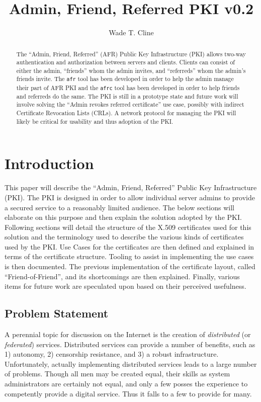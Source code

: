 \documentclass{article}
\title{Admin, Friend, Referred PKI v0.2}
\author{Wade T. Cline}
\begin{document}
\begin{abstract}
The ``Admin, Friend, Referred'' (AFR) Public Key Infrastructure (PKI) allows two-way authentication and authorization between servers and clients.  Clients can consist of either the admin, ``friends'' whom the admin invites, and ``referreds'' whom the admin's friends invite.  The \texttt{afr} tool has been developed in order to help the admin manage their part of AFR PKI and the \texttt{afrc} tool has been developed in order to help friends and referreds do the same.  The PKI is still in a prototype state and future work will involve solving the ``Admin revokes referred certificate'' use case, possibly with indirect Certificate Revocation Lists (CRLs).  A network protocol for managing the PKI will likely be critical for usability and thus adoption of the PKI.
\end{abstract}

\section{Introduction}
This paper will describe the ``Admin, Friend, Referred'' Public Key Infrastructure (PKI).  The PKI is designed in order to allow individual server admins to provide a secured service to a reasonably limited audience.  The below sections will elaborate on this purpose and then explain the solution adopted by the PKI.  Following sections will detail the structure of the X.509 certificates used for this solution and the terminology used to describe the various kinds of certificates used by the PKI.  Use Cases for the certificates are then defined and explained in terms of the certificate structure.  Tooling to assist in implementing the use cases is then documented.  The previous implementation of the certificate layout, called ``Friend-of-Friend'', and its shortcomings are then explained.  Finally, various items for future work are speculated upon based on their perceived usefulness.

\subsection{Problem Statement}
A perennial topic for discussion on the Internet is the creation of \emph{distributed} (or \emph{federated}) services.  Distributed services can provide a number of benefits, such as 1) autonomy, 2) censorship resistance, and 3) a robust infrastructure.  Unfortunately, actually implementing distributed services leads to a large number of problems.  Though all men may be created equal, their skills as system administrators are certainly not equal, and only a few posses the experience to competently provide a digital service.  Thus it falls to a few to provide for many.
\end{document}
